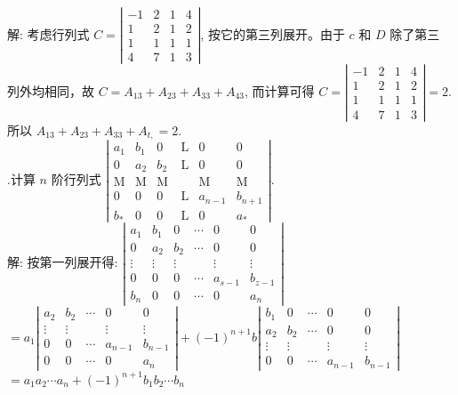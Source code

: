 \documentclass{article}
\begin{document}
解: 考虑行列式 $C=\left|\begin{array}{cccc}-1 & 2 & 1 & 4  \\ 1 & 2 & 1 & 2  \\ 1 & 1 & 1 & 1  \\ 4 & 7 & 1 & 3\end{array}\right|$, 按它的第三列展开。由于 $c$ 和 $D$ 除了第三
列外均相同，故 $C=A_{13}+A_{23}+A_{33}+A_{43}$, 而计算可得
$C=\left|\begin{array}{llll}-1 & 2 & 1 & 4  \\ 1 & 2 & 1 & 2  \\ 1 & 1 & 1 & 1  \\ 4 & 7 & 1 & 3\end{array}\right|=2 .$ 所以 $A_{13}+A_{23}+A_{33}+A_{t,}=2 .$ \\

{.}计算 $n$ 阶行列式 $\left|\begin{array}{llllll}a_{1} & b_{1} & 0 & \mathrm{~L} & 0 & 0  \\ 0 & a_{2} & b_{2} & \mathrm{~L} & 0 & 0  \\ \mathrm{M} & \mathrm{M} & \mathrm{M} & & \mathrm{M} & \mathrm{M}  \\ 0 & 0 & 0 & \mathrm{~L} & a_{n-1} & b_{n+1}  \\ b_{*} & 0 & 0 & \mathrm{~L} & 0 & a_{*}\end{array}\right|$. \\
解: 按第一列展开得:
$\left|\begin{array}{cccccc}a_{1} & b_{1} & 0 & \cdots & 0 & 0  \\ 0 & a_{2} & b_{2} & \cdots & 0 & 0  \\ \vdots & \vdots & \vdots & & \vdots & \vdots  \\ 0 & 0 & 0 & \cdots & a_{s-1} & b_{z-1}  \\ b_{n} & 0 & 0 & \cdots & 0 & a_{n}\end{array}\right|$
$=a_{1}\left|\begin{array}{ccccc}a_{2} & b_{2} & \cdots & 0 & 0  \\ \vdots & \vdots & & \vdots & \vdots  \\ 0 & 0 & \cdots & a_{n-1} & b_{n-1}  \\ 0 & 0 & \cdots & 0 & a_{n}\end{array}\right|+(-1)^{n+1} b\left|\begin{array}{ccccc}b_{1} & 0 & \cdots & 0 & 0  \\ a_{2} & b_{2} & \cdots & 0 & 0  \\ \vdots & \vdots & & \vdots & \vdots  \\ 0 & 0 & \cdots & a_{n-1} & b_{n-1}\end{array}\right|$
$=a_{1} a_{2} \cdots a_{n}+(-1)^{n+1} b_{1} b_{2} \cdots b_{n}$
\end{document}

